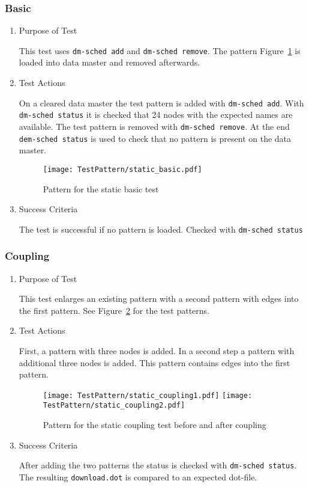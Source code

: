 \subsubsection{Basic}
\begin{enumerate}
	\item Purpose of Test

	This test uses \texttt{dm-sched add} and \texttt{dm-sched remove}. The pattern Figure~\ref{fig:Pattern_for_the_static_basic_test}
	is loaded into data master and removed afterwards.
	\item Test Actions

	On a cleared data master the test pattern is added with \texttt{dm-sched add}. With \texttt{dm-sched status} it is checked
	that 24 nodes with the expected names are available. The test pattern is removed with \texttt{dm-sched remove}. At the
	end \texttt{dem-sched status} is used to check that no pattern is present on the data master.

    \begin{figure}
        \centering
        \texttt{[image: TestPattern/static\_basic.pdf]}
        \caption{Pattern for the static basic test}
        \label{fig:Pattern_for_the_static_basic_test}
    \end{figure}
	\item Success Criteria

	The test is successful if no pattern is loaded. Checked with \texttt{dm-sched status}
\end{enumerate}
\subsubsection{Coupling}
\begin{enumerate}
	\item Purpose of Test

	This test enlarges an existing pattern with a second pattern with edges into the first
	pattern. See Figure~\ref{fig:Pattern_for_the_static_coupling_test} for the test patterns.
	\item Test Actions

	First, a pattern with three nodes is added. In a second step a pattern with additional three nodes is added.
	This pattern contains edges into the first pattern.
    \begin{figure}
        \centering
        \texttt{[image: TestPattern/static\_coupling1.pdf]}
        \texttt{[image: TestPattern/static\_coupling2.pdf]}
        \caption{Pattern for the static coupling test before and after coupling}
        \label{fig:Pattern_for_the_static_coupling_test}
    \end{figure}
	\item Success Criteria

	After adding the two patterns the status is checked with \texttt{dm-sched status}. The resulting \texttt{download.dot} is
	compared to an expected dot-file.
\end{enumerate}
